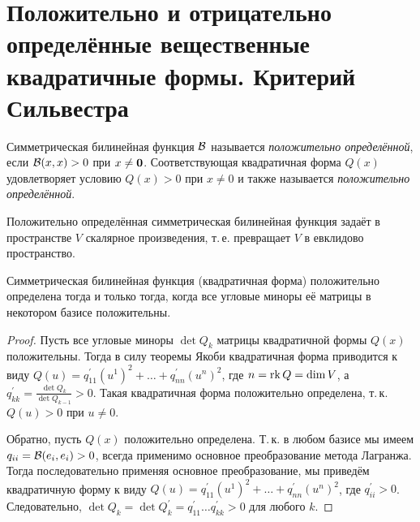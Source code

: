 \section{Положительно и отрицательно определённые вещественные квадратичные формы. Критерий Сильвестра}

\begin{definition}
    Симметрическая билинейная функция $\mathcal{B}$ называется \textit{положительно определённой}, если $\mathcal{B}(x, x) > 0$ при $x \ne \boldsymbol{0}$. Соответствующая квадратичная форма $Q(x)$ удовлетворяет условию $Q(x) > 0$ при $x \ne 0$ и также называется \textit{положительно определённой}.
\end{definition}

Положительно определённая симметрическая билинейная функция задаёт в пространстве $V$ скалярное произведения, т.\,е. превращает $V$ в евклидово пространство.

\begin{theorem}
    Симметрическая билинейная функция (квадратичная форма) положительно определена тогда и только тогда, когда все угловые миноры её матрицы в некотором базисе положительны.
\end{theorem}

\begin{proof}
    Пусть все угловые миноры $\det Q_k$ матрицы квадратичной формы $Q(x)$ положительны. Тогда в силу теоремы Якоби квадратичная форма приводится к виду $Q(u) = q^\prime_{11}(u^1)^2 + \ldots + q^\prime_{nn}(u^n)^2$, где $n = \operatorname{rk} Q = \dim V$, а $q^\prime_{kk} = \frac{\det Q_k}{\det Q_{k - 1}} > 0$. Такая квадратичная форма положительно определена, т.\,к. $Q(u) > 0$ при $u \ne 0$.

    Обратно, пусть $Q(x)$ положительно определена. Т.\,к. в любом базисе мы имеем $q_{ii} = \mathcal{B}(e_i, e_i) > 0$, всегда применимо основное преобразование метода Лагранжа. Тогда последовательно применяя основное преобразование, мы приведём квадратичную форму к виду $Q(u) = q^\prime_{11}(u^1)^2 + \ldots + q^\prime_{nn}(u^n)^2$, где $q^\prime_{ii} > 0$. Следовательно, $\det Q_k = \det Q^\prime_k = q^\prime_{11}\ldots q^\prime_{kk} > 0$ для любого $k$.
\end{proof}


